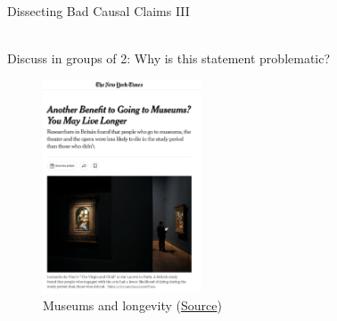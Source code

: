\documentclass[11pt]{beamer}
\begin{document}
\begin{frame}{Dissecting Bad Causal Claims III}

   \begin{alertblock} {\centering \vspace{-1.5ex} \\ Discuss in groups of 2: Why is this statement problematic?  \\ \vspace{-1.5ex} } \end{alertblock}

\begin{figure}[h!t]
    \centering    \includegraphics[width=0.42\textwidth]{figures/s1_nytimes.png}
    \caption{Museums and longevity (\href{https://www.nytimes.com/2019/12/22/us/arts-health-effects-ucl-study.html}{Source})}
    \label{fig:museum}
\end{figure}

\end{frame}
\end{document}
